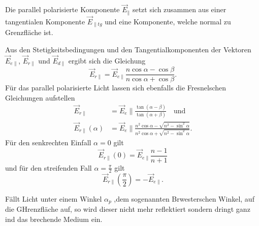 Die parallel polarisierte Komponente $\vec{E}_{\|}$ setzt sich zusammen aus einer tangentialen Komponente $\vec{E}_{\|tg}$
und eine Komponente, welche normal zu Grenzfläche ist.

Aus den Stetigkeitsbedingungen und den Tangentialkomponenten der Vektoren $\vec{E}_{e\|}$, $\vec{E}_{r\|}$ und $\vec{E}_{d\|}$
ergibt sich die Gleichung
\begin{equation}
    \vec{E}_{r\|} = \vec{E}_{e\|} \frac{n \cos \alpha - \cos \beta}{n \cos \alpha + \cos \beta}.
    \label{eqn:keinname}
\end{equation}
Für das parallel polarisierte Licht lassen sich ebenfalls die Fresnelschen Gleichungen aufstellen
\begin{equation}
    \begin{aligned}
    \vec{E}_{r \|}&=\vec{E}_e \| \frac{\tan (\alpha-\beta)}{\tan (\alpha+\beta)} \quad \text{und}\\
    \vec{E}_{r \|}(\alpha)&=\vec{E}_e \| \frac{n^2 \cos \alpha-\sqrt{n^2-\sin ^2 \alpha}}{n^2 \cos \alpha+\sqrt{n^2-\sin ^2 \alpha}} .
    \label{eqn:fresnel2}
    \end{aligned}
\end{equation}
Für den senkrechten Einfall $ \alpha = 0$ gilt
\begin{equation*}
    \vec{E}_{r\|}(0) = \vec{E}_{e\|} \frac{n - 1}{n + 1}
\end{equation*}
und für den streifenden Fall $\alpha= \frac{\pi}{2}$ gilt
\begin{equation*}
    \vec{E}_{r\|}(\frac{\pi}{2}) = -\vec{E}_{e\|}.
\end{equation*}

Fällt Licht unter einem Winkel $\alpha_p$ ,dem sogenannten Brwesterschen Winkel, auf die GHrenzfläche auf, so wird dieser
nicht mehr reflektiert sondern dringt ganz ind das brechende Medium ein.